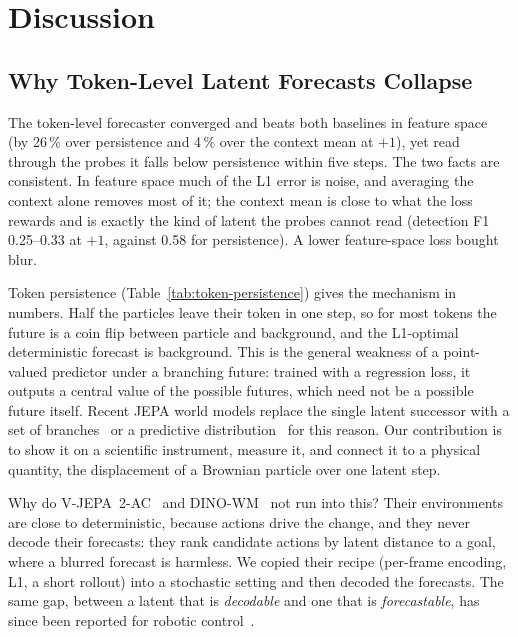 \section{Discussion}
\label{sec:discussion}

\subsection{Why Token-Level Latent Forecasts Collapse}

The token-level forecaster converged and beats both baselines in feature space (by 26\,\%
over persistence and 4\,\% over the context mean at $+1$), yet read through the probes it
falls below persistence within five steps. The two facts are consistent. In feature space
much of the L1 error is noise, and averaging the context alone removes most of it; the
context mean is close to what the loss rewards and is exactly the kind of latent the probes
cannot read (detection F1 0.25--0.33 at $+1$, against 0.58 for persistence). A lower
feature-space loss bought blur.

Token persistence (Table~\ref{tab:token-persistence}) gives the mechanism in numbers.
Half the particles leave their token in one step, so for most tokens the future is a
coin flip between particle and background, and the L1-optimal deterministic forecast is
background. This is the general weakness of a point-valued predictor under a branching future: trained
with a regression loss, it outputs a central value of the possible futures, which need
not be a possible future itself. Recent JEPA world models replace the single latent
successor with a set of branches~\cite{branchjepa} or a predictive distribution~\cite{vjepa_variational}
for this reason. Our
contribution is to show it on a scientific instrument, measure it, and connect it to a
physical quantity, the displacement of a Brownian particle over one latent step.

Why do V-JEPA~2-AC~\cite{assran2025vjepa2} and DINO-WM~\cite{dinowm} not run into
this? Their environments are close to deterministic, because actions drive the change,
and they never decode their forecasts: they rank candidate actions by latent distance to
a goal, where a blurred forecast is harmless. We copied their recipe (per-frame encoding,
L1, a short rollout) into a stochastic setting and then decoded the forecasts. The same
gap, between a latent that is \emph{decodable} and one that is \emph{forecastable}, has
since been reported for robotic control~\cite{jepax}.

